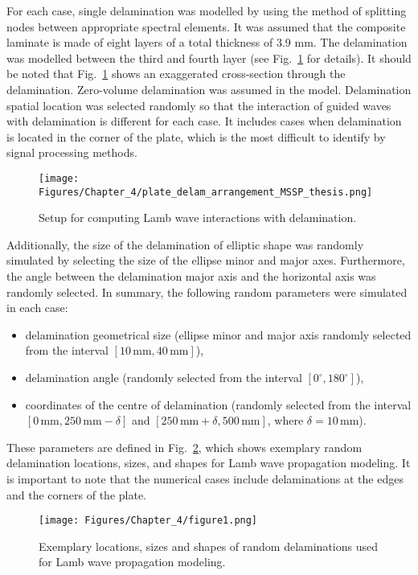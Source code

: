For each case, single delamination was modelled by using the method of splitting nodes between appropriate spectral elements. 
It was assumed that the composite laminate is made of eight layers of a total thickness of 3.9 mm.
The delamination was modelled between the third and fourth layer (see Fig.~\ref{fig:plate_setup} for details).
It should be noted that Fig.~\ref{fig:plate_setup} shows an exaggerated cross-section through the delamination. 
Zero-volume delamination was assumed in the model. 
Delamination spatial location was selected randomly so that the interaction of guided waves with delamination is different for each case.
It includes cases when delamination is located in the corner of the plate, which is the most difficult to identify by signal processing methods.
\begin{figure}
	\centering
	\texttt{[image: Figures/Chapter\_4/plate\_delam\_arrangement\_MSSP\_thesis.png]}
	\caption{Setup for computing Lamb wave interactions with delamination.}
	\label{fig:plate_setup}
\end{figure}
Additionally, the size of the delamination of elliptic shape was randomly simulated by selecting the size of the ellipse minor and major axes.
Furthermore, the angle between the delamination major axis and the horizontal axis was randomly selected.
In summary, the following random parameters were simulated in each case:
\begin{itemize}
	\item delamination geometrical size	(ellipse minor and major axis randomly selected from the interval \(\left[10 \, \textrm{mm}, 40\, \textrm{mm}\right]\)),
	\item delamination angle (randomly selected from the interval \( \left[ 0^{\circ}, 180^{\circ} \right]\)),
	\item coordinates of the centre of delamination (randomly selected from the interval \(\left[0\, \textrm{mm}, 250\, \textrm{mm} -\delta \right]\) and \( \left[250\, \textrm{mm}+\delta, 500\, \textrm{mm} \right] \), where \(\delta = 10\, \textrm{mm}\)).
\end{itemize}
These parameters are defined in Fig.~\ref{fig:random_delaminations}, which shows exemplary random delamination locations, sizes, and shapes for Lamb wave propagation modeling.
It is important to note that the numerical cases include delaminations at the edges and the corners of the plate.
\begin{figure}[!h]
	\centering
	\texttt{[image: Figures/Chapter\_4/figure1.png]}
	\caption{Exemplary locations, sizes and shapes of random delaminations used for Lamb wave propagation modeling.}
	\label{fig:random_delaminations}
\end{figure}

